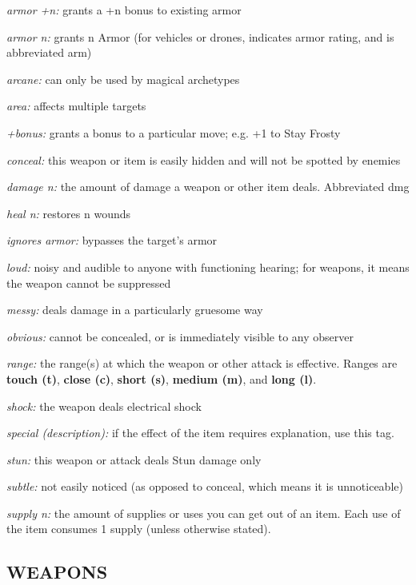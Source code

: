 \documentclass[oneside,10pt]{article}
\begin{document}
\begin{multicols}{2}
\begin{dent}
    \textit{armor +n:} grants a +n bonus to existing armor

    \textit{armor n:} grants n Armor (for vehicles or drones,
    indicates armor rating, and is abbreviated arm)

    \textit{arcane:} can only be used by magical archetypes

    \textit{area:} affects multiple targets

    \textit{+bonus:} grants a bonus to a particular move; e.g. +1 to
    Stay Frosty

    \textit{conceal:} this weapon or item is easily hidden and will
    not be spotted by enemies

    \textit{damage n:} the amount of damage a weapon or other item
    deals. Abbreviated dmg

    \textit{heal n:} restores n wounds

    \textit{ignores armor:} bypasses the target’s armor

    \textit{loud:} noisy and audible to anyone with functioning
    hearing; for weapons, it means the weapon cannot be suppressed

    \textit{messy:} deals damage in a particularly gruesome way

    \textit{obvious:} cannot be concealed, or is immediately visible
    to any observer

    \textit{range:} the range(s) at which the weapon or other attack
    is effective. Ranges are \textbf{touch (t)}, \textbf{close (c)},
    \textbf{short (s)}, \textbf{medium (m)}, and \textbf{long (l)}.

    \textit{shock:} the weapon deals electrical shock

    \textit{special (description):} if the effect of the item requires
    explanation, use this tag.

    \textit{stun:} this weapon or attack deals Stun damage only

    \textit{subtle:} not easily noticed (as opposed to conceal, which
    means it is unnoticeable)

    \textit{supply n:} the amount of supplies or uses you can get out
    of an item. Each use of the item consumes 1 supply (unless
    otherwise stated).
  \end{dent}


  \subsection{WEAPONS}


\end{multicols}
\end{document}
